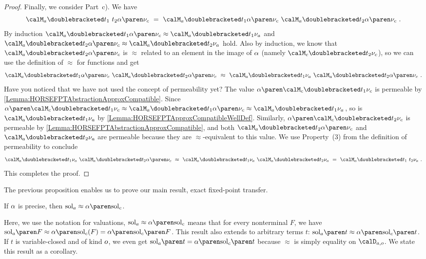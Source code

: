 \documentclass[../../diss.tex]{subfiles}
\begin{document}
\begin{proof}
    Finally, we consider Part~c).
    We have
    \[
        \sema{t_1 \appl t_2}{\abs{\valc}}
        \ = \
        \sema{t_1}{\abs{\valc}}
        \appl
        \sema{t_2}{\abs{\valc}}
        \ .
    \]
    By induction $\sema{t_1}{\abs{\valc}} \approx \sema{t_1}{\vala}$ and
    $\sema{t_2}{\abs{\valc}} \approx \sema{t_2}{\vala}$ hold.
    Also by induction, we know that $\sema{t_2}{\abs{\valc}}$ is $\approx$ related to an element in the image of $\abs$ (namely $\semc{t_2}{\valc}$), so we can use the definition of $\approx$ for functions and get
    \[
        \sema{t_1}{\abs{\valc}} \appl \sema{t_2}{\abs{\valc}}
        \ \approx \
        \sema{t_1}{\vala} \appl \sema{t_2}{\abs{\valc}}
        \ .
    \]
    Have you noticed that we have not used the concept of permeability yet?
    The value $\abs{\semc{t_1}{\valc}}$ is permeable by \cref{Lemma:HORSEFPTAbstractionApproxCompatible}.
    Since $\abs{\semc{t_1}{\valc}} \approx  \sema{t_1}{\abs{\valc}} \approx \sema{t_1}{\vala}$, so is $\sema{t_1}{\vala}$ by \cref{Lemma:HORSEFPTApproxCompatibleWellDef}.
    Similarly, $\abs{\semc{t_2}{\valc}}$ is permeable by \cref{Lemma:HORSEFPTAbstractionApproxCompatible}, and both $\sema{t_2}{\abs{\valc}}$ and $\sema{t_2}{\vala}$ are permeable because they are $\approx$-equivalent to this value.
    We use Property~(3) from the definition of permeability to conclude
    \[
        \sema{t_1}{\vala} \appl \sema{t_2}{\abs{\valc}}
        \ \approx \
        \sema{t_1}{\vala} \appl \sema{t_2}{\vala}
        \ = \
        \sema{t_1 \appl t_2}{\vala}
        \ .
    \]
    This completes the proof.
\end{proof}

%
\cheatpagebreak
%

The previous proposition enables us to prove our main result, exact fixed-point transfer.

\begin{theorem}%
\label{Theorem:HORSEFPT}%
    If $\abs$ is precise, then $\sola \approx \abs{\solc}$.
\end{theorem}

Here, we use the notation for valuations, \ie  $\sola \approx \abs{\solc}$ means that for every nonterminal $F$, we have $\sola{F} \approx \abs{\solc}(F) = \abs{\solc{F}}$.
This result also extends to arbitrary terms $t$: $\sola{t} \approx \abs{\solc{t}}$.
If $t$ is variable-closed and of kind $o$, we even get $\sola{t} = \abs{\solc{t}}$ because $\approx$ is simply equality on $\domaina{\ground}$.
We state this result as a corollary.
\end{document}
